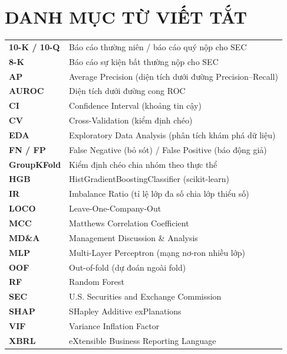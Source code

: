 \documentclass[13pt,a4paper]{extreport}
\begin{document}
\chapter*{DANH MỤC TỪ VIẾT TẮT}
\noindent\begin{longtable}{>{\bfseries}p{3.6cm}p{10.6cm}}
10-K / 10-Q & Báo cáo thường niên / báo cáo quý nộp cho SEC \\
8-K & Báo cáo sự kiện bất thường nộp cho SEC \\
AP & Average Precision (diện tích dưới đường Precision--Recall) \\
AUROC & Diện tích dưới đường cong ROC \\
CI & Confidence Interval (khoảng tin cậy) \\
CV & Cross-Validation (kiểm định chéo) \\
EDA & Exploratory Data Analysis (phân tích khám phá dữ liệu) \\
FN / FP & False Negative (bỏ sót) / False Positive (báo động giả) \\
GroupKFold & Kiểm định chéo chia nhóm theo thực thể \\
HGB & HistGradientBoostingClassifier (scikit-learn) \\
IR & Imbalance Ratio (tỉ lệ lớp đa số chia lớp thiểu số) \\
LOCO & Leave-One-Company-Out \\
MCC & Matthews Correlation Coefficient \\
MD\&A & Management Discussion \& Analysis \\
MLP & Multi-Layer Perceptron (mạng nơ-ron nhiều lớp) \\
OOF & Out-of-fold (dự đoán ngoài fold) \\
RF & Random Forest \\
SEC & U.S. Securities and Exchange Commission \\
SHAP & SHapley Additive exPlanations \\
VIF & Variance Inflation Factor \\
XBRL & eXtensible Business Reporting Language \\
\end{longtable}
\clearpage

\setcounter{page}{1}
\pagestyle{fancy}
\fancyhf{}
\cfoot{\thepage}
\end{document}

